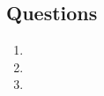\documentclass{article}
\begin{document}
\subsection{Questions}

\begin{enumerate}
	\item 
	\item 
	\item 
\end{enumerate}

\end{document}

